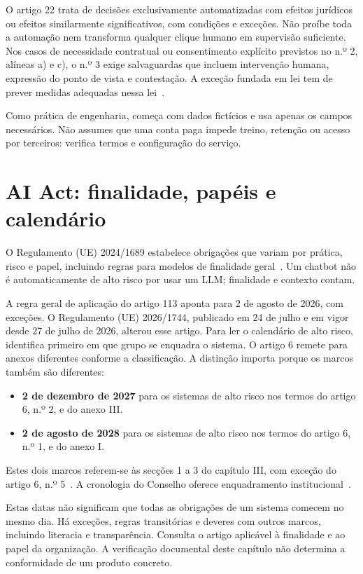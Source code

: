 O artigo 22 trata de decisões exclusivamente automatizadas com efeitos jurídicos ou efeitos similarmente significativos, com condições e exceções. Não proíbe toda a automação nem transforma qualquer clique humano em supervisão suficiente. Nos casos de necessidade contratual ou consentimento explícito previstos no n.º 2, alíneas a) e c), o n.º 3 exige salvaguardas que incluem intervenção humana, expressão do ponto de vista e contestação. A exceção fundada em lei tem de prever medidas adequadas nessa lei~\citep{rgpd2016}.

Como prática de engenharia, começa com dados fictícios e usa apenas os campos necessários. Não assumes que uma conta paga impede treino, retenção ou acesso por terceiros: verifica termos e configuração do serviço.

\section{AI Act: finalidade, papéis e calendário}
O Regulamento (UE) 2024/1689 estabelece obrigações que variam por prática, risco e papel, incluindo regras para modelos de finalidade geral~\citep{aiact2024}. Um chatbot não é automaticamente de alto risco por usar um LLM; finalidade e contexto contam.

A regra geral de aplicação do artigo 113 aponta para 2 de agosto de 2026, com exceções. O Regulamento (UE) 2026/1744, publicado em 24 de julho e em vigor desde 27 de julho de 2026, alterou esse artigo. Para ler o calendário de alto risco, identifica primeiro em que grupo se enquadra o sistema. O artigo 6 remete para anexos diferentes conforme a classificação. A distinção importa porque os marcos também são diferentes:

\begin{itemize}[leftmargin=*]
\item \textbf{2 de dezembro de 2027} para os sistemas de alto risco nos termos do artigo 6, n.º 2, e do anexo III.
\item \textbf{2 de agosto de 2028} para os sistemas de alto risco nos termos do artigo 6, n.º 1, e do anexo I.
\end{itemize}

Estes dois marcos referem-se às secções 1 a 3 do capítulo III, com exceção do artigo 6, n.º 5~\citep{aiomnibus2026}. A cronologia do Conselho oferece enquadramento institucional~\citep{conselho2026}.

Estas datas não significam que todas as obrigações de um sistema comecem no mesmo dia. Há exceções, regras transitórias e deveres com outros marcos, incluindo literacia e transparência. Consulta o artigo aplicável à finalidade e ao papel da organização. A verificação documental deste capítulo não determina a conformidade de um produto concreto.

